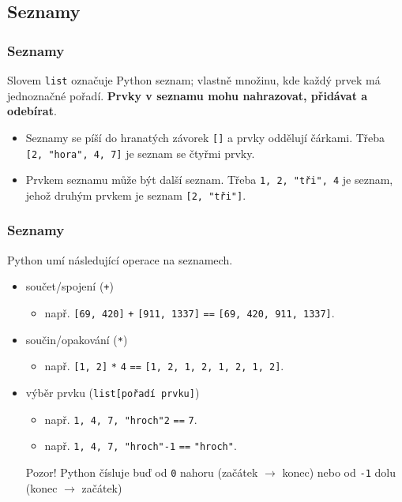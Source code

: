 \subsection[Seznamy]{Seznamy}

\begin{frame}
 \frametitle{Seznamy}
 \begin{tcolorbox}[title=Datový tip \texttt{list}]
  Slovem \texttt{\alert{list}} označuje Python seznam; vlastně množinu, kde
  každý prvek má jednoznačné pořadí. \textbf{Prvky v seznamu mohu nahrazovat,
  přidávat a odebírat}.
 \end{tcolorbox}
 \pause
 \begin{itemize}
  \item<2-> Seznamy se píší do \alert{hranatých závorek} \texttt{[]} a prvky
   oddělují čárkami. Třeba \texttt{[2,~"hora", 4, 7]} je seznam se čtyřmi
   prvky.
  \item<3-> Prvkem seznamu může být další seznam. Třeba \texttt{\mdb{[}1,
   \mlg{[}2, "tři"\mlg{]}, 4\mdb{]}} je seznam, jehož druhým prvkem je seznam
   \texttt{[2, "tři"]}.
 \end{itemize}
\end{frame}

\begin{frame}
 \frametitle{Seznamy}
 Python umí následující operace na seznamech.
 \begin{itemize}
  \item<1-> součet/spojení (\texttt{+})
   \begin{itemize}
    \item např. \texttt{[69, 420]} \texttt{+} \texttt{[911, 1337]} \texttt{==}
     \texttt{[69, 420, 911, 1337]}.
   \end{itemize}
  \item<2-> součin/opakování (\texttt{*})
   \begin{itemize}
    \item např. \texttt{[1, 2]} \texttt{*} \texttt{4} \texttt{==} \texttt{[1, 2,
     1, 2, 1, 2, 1, 2]}.
   \end{itemize}
  \item<3-> výběr prvku (\texttt{list[pořadí prvku]})
   \begin{itemize}
    \item např. \texttt{\mlg{[}1, 4, 7, "hroch"\mlg{]}\mlb{[}2\mlb{]}}
     \texttt{==} \texttt{7}.
    \item např. \texttt{\mlg{[}1, 4, 7, "hroch"\mlg{]}\mlb{[}-1\mlb{]}}
     \texttt{==} \texttt{"hroch"}.
   \end{itemize}
   \alert{Pozor!} Python čísluje buď od \texttt{0} nahoru (začátek $\rightarrow$
   konec) nebo od \texttt{-1} dolu (konec $\rightarrow$ začátek)
 \end{itemize}
\end{frame}


